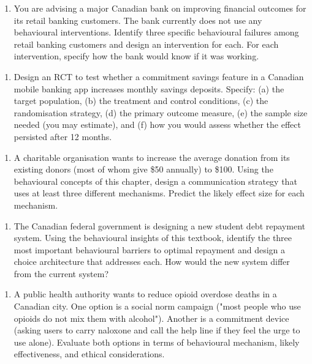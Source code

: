 \documentclass[12pt, letterpaper]{article}
\begin{document}
\begin{enumerate}
\item You are advising a major Canadian bank on improving financial outcomes for its retail banking customers. The bank currently does not use any behavioural interventions. Identify three specific behavioural failures among retail banking customers and design an intervention for each. For each intervention, specify how the bank would know if it was working.
\end{enumerate}

\begin{enumerate}
\item Design an RCT to test whether a commitment savings feature in a Canadian mobile banking app increases monthly savings deposits. Specify: (a) the target population, (b) the treatment and control conditions, (c) the randomisation strategy, (d) the primary outcome measure, (e) the sample size needed (you may estimate), and (f) how you would assess whether the effect persisted after 12 months.
\end{enumerate}

\begin{enumerate}
\item A charitable organisation wants to increase the average donation from its existing donors (most of whom give \$50 annually) to \$100. Using the behavioural concepts of this chapter, design a communication strategy that uses at least three different mechanisms. Predict the likely effect size for each mechanism.
\end{enumerate}

\begin{enumerate}
\item The Canadian federal government is designing a new student debt repayment system. Using the behavioural insights of this textbook, identify the three most important behavioural barriers to optimal repayment and design a choice architecture that addresses each. How would the new system differ from the current system?
\end{enumerate}

\begin{enumerate}
\item A public health authority wants to reduce opioid overdose deaths in a Canadian city. One option is a social norm campaign ("most people who use opioids do not mix them with alcohol"). Another is a commitment device (asking users to carry naloxone and call the help line if they feel the urge to use alone). Evaluate both options in terms of behavioural mechanism, likely effectiveness, and ethical considerations.
\end{enumerate}
\end{document}

